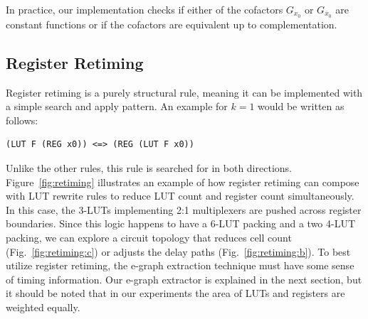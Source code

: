 In practice, our implementation checks if either of the cofactors $G_{x_0}$ or
$G_{\overline{x}_0}$ are constant functions or if the cofactors are equivalent
up to complementation.

\subsection{Register Retiming}\label{sec:rewrites:retiming}

Register retiming is a purely structural rule, meaning it can be implemented
with a simple search and apply pattern. An example for $k=1$ would be written
as follows:

\begin{lstlisting}
(LUT F (REG x0)) <=> (REG (LUT F x0))
\end{lstlisting}

Unlike the other rules, this rule is searched for in both directions.
Figure~\ref{fig:retiming} illustrates an example of how register retiming can
compose with LUT rewrite rules to reduce LUT count and register count
simultaneously. In this case, the 3-LUTs implementing 2:1 multiplexers are
pushed across register boundaries. Since this logic happens to have a 6-LUT
packing and a two 4-LUT packing, we can explore a circuit topology that reduces
cell count (Fig.~\ref{fig:retiming:c}) or adjusts the delay paths
(Fig.~\ref{fig:retiming:b}). To best utilize register retiming, the e-graph
extraction technique must have some sense of timing information. Our e-graph
extractor is explained in the next section, but it should be noted that in our
experiments the area of LUTs and registers are weighted equally.